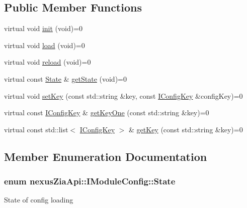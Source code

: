 \subsection*{Public Member Functions}
\begin{DoxyCompactItemize}
\item 
virtual void \hyperlink{classnexusZiaApi_1_1IModuleConfig_ac41aad2c35f3634e0bb23e4e55e1f8b8}{init} (void)=0
\item 
virtual void \hyperlink{classnexusZiaApi_1_1IModuleConfig_a9b1efedd95b96b2e019470a89370997a}{load} (void)=0
\item 
virtual void \hyperlink{classnexusZiaApi_1_1IModuleConfig_a9171887da472d0d4c9ee237ed9d1d754}{reload} (void)=0
\item 
virtual const \hyperlink{classnexusZiaApi_1_1IModuleConfig_af31b1666dea53f8776c7399e6df9e865}{State} \& \hyperlink{classnexusZiaApi_1_1IModuleConfig_a4e54fa1883c81395351091150b3aefb4}{get\+State} (void)=0
\item 
virtual void \hyperlink{classnexusZiaApi_1_1IModuleConfig_a26b6b940d232e699a405ad588ffab040}{set\+Key} (const std\+::string \&key, const \hyperlink{classnexusZiaApi_1_1IConfigKey}{I\+Config\+Key} \&config\+Key)=0
\item 
virtual const \hyperlink{classnexusZiaApi_1_1IConfigKey}{I\+Config\+Key} \& \hyperlink{classnexusZiaApi_1_1IModuleConfig_a417a022a19e631ebdc360cc5d06c91d2}{get\+Key\+One} (const std\+::string \&key)=0
\item 
virtual const std\+::list$<$ \hyperlink{classnexusZiaApi_1_1IConfigKey}{I\+Config\+Key} $>$ \& \hyperlink{classnexusZiaApi_1_1IModuleConfig_a277c40a0589820ac67f3c33bfa8a79da}{get\+Key} (const std\+::string \&key)=0
\end{DoxyCompactItemize}


\subsection{Member Enumeration Documentation}
\subsubsection[{\texorpdfstring{State}{State}}]{\setlength{\rightskip}{0pt plus 5cm}enum {\bf nexus\+Zia\+Api\+::\+I\+Module\+Config\+::\+State}\hspace{0.3cm}{\ttfamily [strong]}}\hypertarget{classnexusZiaApi_1_1IModuleConfig_af31b1666dea53f8776c7399e6df9e865}{}\label{classnexusZiaApi_1_1IModuleConfig_af31b1666dea53f8776c7399e6df9e865}
State of config loading 

